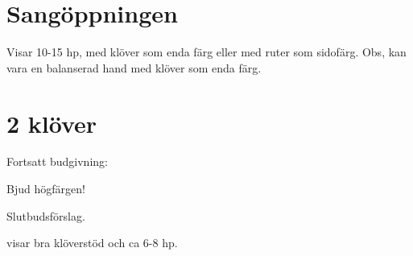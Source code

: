 \section{Sangöppningen}

Visar 10-15 hp, med klöver som enda färg eller med ruter som sidofärg. Obs,
kan vara en balanserad hand med klöver som enda färg.

\section{2 klöver}

Fortsatt budgivning:

\bbe
\item[-\ru{2}] Bjud högfärgen!
\item[-\ho{2}] Slutbudsförslag.
\item[-\NT{2} och högre] visar bra klöverstöd och ca 6-8 hp.
\ebe

